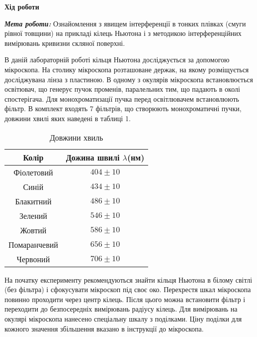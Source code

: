 \begin{center}
    \Large{\textbf{Хід роботи}}    
\end{center}

\vspace{1mm}

\textit{\textbf{Мета роботи:}} 
Ознайомлення з явищем інтерференції в тонких плівках (смуги рівної товщини)
на прикладі кілець Ньютона і з методикою інтерференційних вимірювань
кривизни скляної поверхні.
\bigbreak


В даній лабораторній роботі кільця Ньютона досліджується за допомогою
мікроскопа. На столику мікроскопа розташоване держак, на якому розміщується
досліджувана лінза з пластиною. В одному з окулярів мікроскопа 
встановлюється освітювач, що генерує пучок променів, паралельних тим, що падають в
околі спостерігача. Для монохроматизації пучка перед освітлювачем 
встановлюють фільтр. В комплект входять 7 фільтрів, що створюють монохроматичні
пучки, довжини хвилі яких наведені в таблиці 1.

\begin{table}[h]
    \centering
    \begin{tabular}{ |c|c| }
        \hline
        \textbf{Колір} & \textbf{Дожина швилі $\lambda$(нм)} \\
        \hline
        Фіолетовий & $404 \pm 10$ \\
        \hline
        Синій & $434 \pm 10$ \\
        \hline
        Блакитний  & $486 \pm 10$ \\
        \hline
        Зелений & $546 \pm 10$ \\
        \hline
        Жовтий & $586 \pm 10$ \\
        \hline
        Помаранчевий & $656 \pm 10$ \\
        \hline
        Червоний & $706 \pm 10$ \\
        \hline
    \end{tabular}
    \caption{Довжини хвиль}
\end{table}


На початку експерименту рекомендуються знайти кільця Ньютона в
білому світлі (без фільтра) і сфокусувати мікроскоп 
під своє око. Перехрестя шкал мікроскопа повинно 
проходити через центр кілець. Після цього
можна встановити фільтр і переходити
до безпосередніх вимірювань радіусу
кілець. Для вимірювань на окулярі мікроскопа
нанесено спеціальну шкалу з поділками. Ціну поділки для кожного
значення збільшення вказано в інструкції до мікроскопа.


